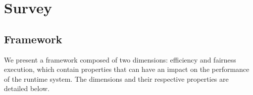 \section{Survey}
\label{sec:survey}

\subsection{{Framework}}
\label{subsec:framework}

\noindent 
We present a framework composed of two dimensions: efficiency and fairness execution, which contain properties that can have an impact on the performance of the runtime system. The dimensions and their respective properties are detailed below.

